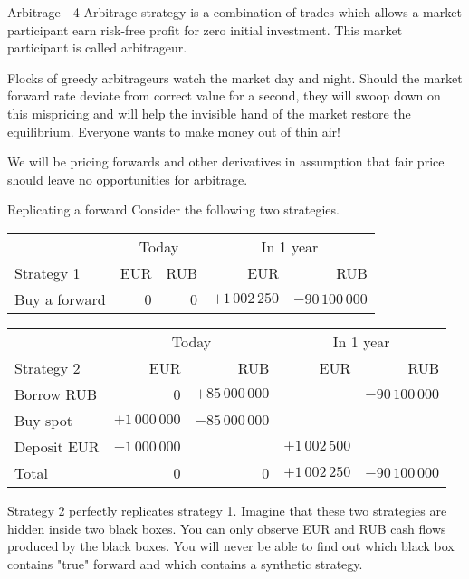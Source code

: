 \documentclass{beamer}
\begin{document}
\begin{frame}{Arbitrage - 4}
\justify
\alert{Arbitrage strategy} is a combination of trades which allows a market participant earn risk-free profit for zero initial investment. This market participant is called \alert{arbitrageur}.

\justify
Flocks of greedy arbitrageurs watch the market day and night. Should the market forward rate deviate from correct value for a second, they will swoop down on this mispricing and will help the invisible hand of the market restore the equilibrium. Everyone wants to make money out of thin air!

\justify
We will be pricing forwards and other derivatives in assumption that fair price should leave no opportunities for arbitrage.
\end{frame}



\begin{frame}{Replicating a forward}
\justify
Consider the following two strategies.

\justify
\small{
\begin{tabular}{l|r|r|r|r}
 & \multicolumn{2}{c|}{Today} & \multicolumn{2}{c}{In 1 year} \\ \cline{2-5}
Strategy  1& EUR & RUB & EUR & RUB \\ \hline
Buy a forward & 0                             & 0                               & $+1\,002\,250$ & $-90\,100\,000$
\end{tabular}
}

\justify
\small{
\begin{tabular}{l|r|r|r|r}
& \multicolumn{2}{c|}{Today} & \multicolumn{2}{c}{In 1 year} \\ \cline{2-5}
Strategy 2 & EUR & RUB & EUR & RUB \\ \hline
Borrow RUB & 0                            & $+85\,000\,000$ &                    & $-90\,100\,000$ \\
Buy spot        & $+1\,000\,000$ & $-85\,000\,000$  &                     &                                  \\
Deposit EUR & $-1\,000\,000$  &                                  & $+1\,002\,500$ & \\  \hline
Total & 0 & 0 &  $+1\,002\,250$ & $-90\,100\,000$
\end{tabular}
}

\justify
Strategy 2 perfectly \alert{replicates} strategy 1. Imagine that these two strategies are hidden inside two black boxes. You can only observe EUR and RUB cash flows produced by the black boxes. You will never be able to find out which black box contains "true" forward and which contains a synthetic strategy.
\end{frame}
\end{document}

